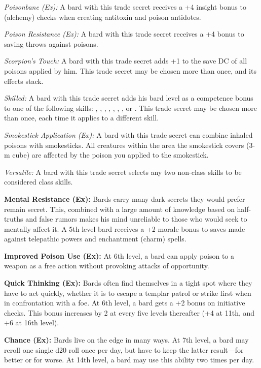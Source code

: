 \textit{Poisonbane (Ex):} A bard with this trade secret receives a +4 insight bonus to  (alchemy) checks when creating antitoxin and poison antidotes.

\textit{Poison Resistance (Ex):} A bard with this trade secret receives a +4 bonus to saving throws against poisons.

\textit{Scorpion's Touch:} A bard with this trade secret adds +1 to the save DC of all poisons applied by him. This trade secret may be chosen more than once, and its effects stack.

\textit{Skilled:} A bard with this trade secret adds \onequarter his bard level as a competence bonus to one of the following skills: , , , , , , ,  or . This trade secret may be chosen more than once, each time it applies to a different skill.

\textit{Smokestick Application (Ex):} A bard with this trade secret can combine inhaled poisons with smokesticks. All creatures within the area the smokestick covers (3-m cube) are affected by the poison you applied to the smokestick.

\textit{Versatile:} A bard with this trade secret selects any two non-class skills to be considered class skills.


\textbf{Mental Resistance (Ex):} Bards carry many dark secrets they would prefer remain secret. This, combined with a large amount of knowledge based on half-truths and false rumors makes his mind unreliable to those who would seek to mentally affect it. A 5th level bard receives a +2 morale bonus to saves made against telepathic powers and enchantment (charm) spells.

\textbf{Improved Poison Use (Ex):} At 6th level, a bard can apply poison to a weapon as a free action without provoking attacks of opportunity.

\textbf{Quick Thinking (Ex):} Bards often find themselves in a tight spot where they have to act quickly, whether it is to escape a templar patrol or strike first when in confrontation with a foe. At 6th level, a bard gets a +2 bonus on initiative checks. This bonus increases by 2 at every five levels thereafter (+4 at 11th, and +6 at 16th level).

\textbf{Chance (Ex):} Bards live on the edge in many ways. At 7th level, a bard may reroll one single d20 roll once per day, but have to keep the latter result---for better or for worse. At 14th level, a bard may use this ability two times per day.

